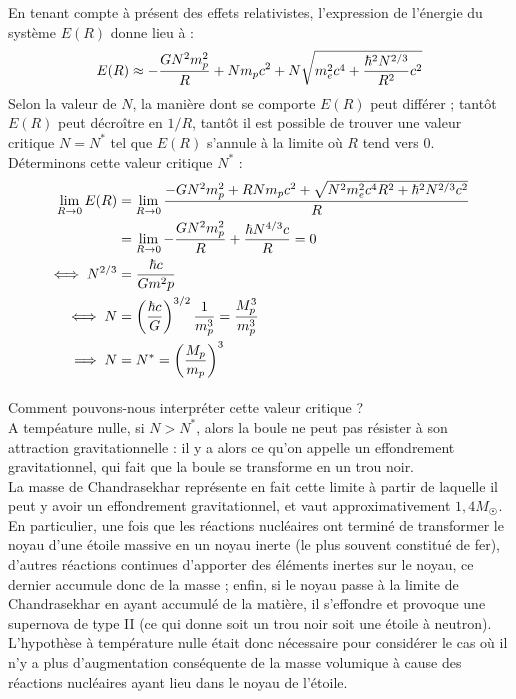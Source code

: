\documentclass[../Notes de cours]{subfiles}
\begin{document}
En tenant compte à présent des effets relativistes, l'expression de l'énergie du système $E(R)$ donne lieu à : 
\begin{equation}
E(R) \approx - \frac{GN^2 m_p^2}{R} + N m_p c^2 + N \sqrt{m_e^2c^4 + \frac{\hbar^2N^{2/3}}{R^2}c^2} \\
\end{equation}
Selon la valeur de $N$, la manière dont se comporte $E(R)$ peut différer ; tantôt $E(R)$ peut décroître en $1/R$, tantôt il est possible de trouver une valeur critique $N = N^*$ tel que $E(R)$ s'annule à la limite où $R$ tend vers 0. Déterminons cette valeur critique $N^*$ : 
\begin{align}
\lim_{R\to 0} E(R) &= \lim_{R\to 0} \frac{-GN^2m^2_p + RNm_pc^2 + \sqrt{N^2m^2_ec^4R^2 + \hbar^2 N^{2/3} c^2}}{R} \notag \\
&= \lim_{R\to 0} - \frac{GN^2 m_p^2}{R} + \frac{\hbar N^{4/3} c}{R} = 0 \notag \\
\iff N^{2/3} &= \frac{\hbar c}{Gm^2p} \notag \\
\iff N &= \left( \frac{\hbar c}{G} \right)^{3/2} \frac{1}{m_p^3} = \frac{M_{p}^3}{m_p^3} \notag \\
\implies N &= N^* = \left( \frac{M_p}{m_p} \right)^3
\end{align}


\paragraph{} Comment pouvons-nous interpréter cette valeur critique ? \\
A tempéature nulle, si $N > N^*$, alors la boule ne peut pas résister à son attraction gravitationnelle : il y a alors ce qu'on appelle un effondrement gravitationnel, qui fait que la boule se transforme en un trou noir. \\
La masse de Chandrasekhar représente en fait cette limite à partir de laquelle il peut y avoir un effondrement gravitationnel, et vaut approximativement $1,4 M_{\astrosun}$. \\

En particulier, une fois que les réactions nucléaires ont terminé de transformer le noyau d'une étoile massive en un noyau inerte (le plus souvent constitué de fer), d'autres réactions continues d'apporter des éléments inertes sur le noyau, ce dernier accumule donc de la masse ; enfin, si le noyau passe à la limite de Chandrasekhar en ayant accumulé de la matière, il s'effondre et provoque une supernova de type II (ce qui donne soit un trou noir soit une étoile à neutron).\\
L'hypothèse à température nulle était donc nécessaire pour considérer le cas où il n'y a plus d'augmentation conséquente de la masse volumique à cause des réactions nucléaires ayant lieu dans le noyau de l'étoile. 
\end{document}
